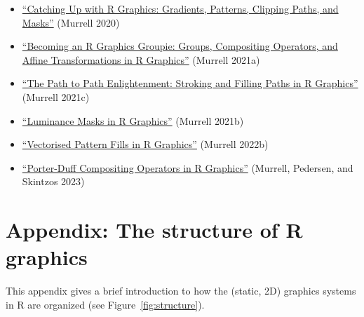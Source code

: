 \begin{itemize}
\item
  \href{https://stattech.blogs.auckland.ac.nz/2020/07/14/2020-04-catching-up-with-r-graphics/}{``Catching Up with R Graphics: Gradients, Patterns, Clipping Paths, and Masks''} (Murrell 2020)
\item
  \href{https://stattech.blogs.auckland.ac.nz/2021/11/15/2021-02-groups-compositing-operators-and-affine-transformations-in-r-graphics}{``Becoming an R Graphics Groupie: Groups, Compositing Operators, and Affine Transformations in R Graphics''} (Murrell 2021a)
\item
  \href{https://stattech.blogs.auckland.ac.nz/2021/11/16/2021-03-stroking-and-filling-paths-in-r-graphics}{``The Path to Path Enlightenment: Stroking and Filling Paths in R Graphics''} (Murrell 2021c)
\item
  \href{https://stattech.blogs.auckland.ac.nz/2021/12/01/2021-04-luminance-masks-in-r-graphics}{``Luminance Masks in R Graphics''} (Murrell 2021b)
\item
  \href{https://stattech.wordpress.fos.auckland.ac.nz/2022/06/01/2022-01-vectorised-pattern-fills-in-r-graphics/}{``Vectorised Pattern Fills in R Graphics''} (Murrell 2022b)
\item
  \href{https://stattech.wordpress.fos.auckland.ac.nz/2023/05/22/2023-02-porter-duff-compositing-operators-in-r-graphics/}{``Porter-Duff Compositing Operators in R Graphics''} (Murrell, Pedersen, and Skintzos 2023)
\end{itemize}

\hypertarget{rgraphics}{%
\section{Appendix: The structure of R graphics}\label{rgraphics}}

This appendix gives a brief introduction to how the (static, 2D)
graphics systems
in R are organized (see Figure~\ref{fig:structure}).

